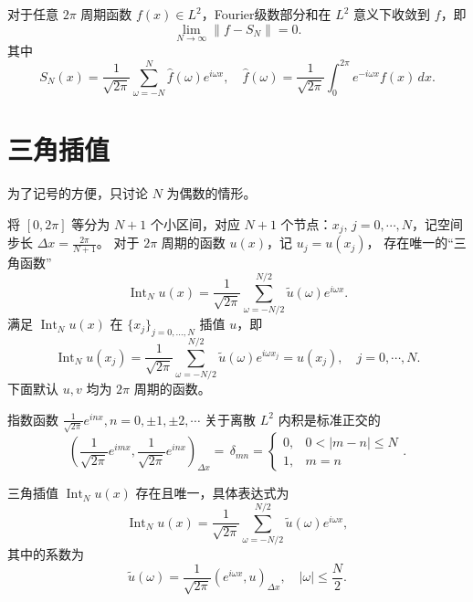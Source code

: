 \begin{theorem}
    对于任意 $2\pi$ 周期函数 $f(x) \in L^2$，Fourier级数部分和在 $L^2$ 意义下收敛到 $f$，即
    \[
        \lim_{N \to \infty} \|f - S_N\| = 0.
    \]
    其中
    \[
        S_N(x) = \frac{1}{\sqrt{2\pi}} \sum_{\omega = -N}^N \hat{f}(\omega) e^{i \omega x},\quad
        \hat{f}(\omega) = \frac{1}{\sqrt{2\pi}} \int_0^{2\pi} e^{-i \omega x}f(x)\,dx.
    \]
\end{theorem}


\section{三角插值}

为了记号的方便，只讨论 $N$ 为偶数的情形。

将 $[0,2\pi]$ 等分为 $N+1$ 个小区间，对应 $N+1$ 个节点：$x_j$, $j = 0,\cdots,N$，记空间步长 $\Delta x = \frac{2\pi}{N+1}$。
对于 $2\pi$ 周期的函数 $u(x)$，记 $u_j = u(x_j)$，
存在唯一的“三角函数”
\[
    \operatorname{Int}_N u(x) = \frac{1}{\sqrt{2\pi}} \sum_{\omega = -N/2}^{N/2} \widetilde{u}(\omega) e^{i \omega x}.
\]
满足 $\operatorname{Int}_N u(x)$ 在 $\{x_j\}_{j=0,\dots,N}$ 插值 $u$，即
\[
    \operatorname{Int}_N u(x_j) = \frac{1}{\sqrt{2\pi}} \sum_{\omega = -N/2}^{N/2} \widetilde{u}(\omega) e^{i \omega x_j} = u(x_j),\quad
    j=0,\cdots,N.
\]
下面默认 $u,v$ 均为 $2\pi$ 周期的函数。

\begin{lemma}
    指数函数 $\frac{1}{\sqrt{2\pi}} e^{i n x},n=0,\pm 1,\pm 2,\cdots$
    关于离散 $L^2$ 内积是标准正交的
    \[
        \left(\frac{1}{\sqrt{2\pi}} e^{i m x},\frac{1}{\sqrt{2\pi}} e^{i n x}\right)_{\Delta x}
        =\, \delta_{mn} =
        \begin{cases}
            0, & 0 < |m-n| \le N \\
            1, & m = n
        \end{cases}.
    \]
\end{lemma}


\begin{theorem}
    三角插值 $\operatorname{Int}_N u(x)$ 存在且唯一，具体表达式为
    \[
        \operatorname{Int}_N u(x) = \frac{1}{\sqrt{2\pi}} \sum_{\omega = -N/2}^{N/2} \widetilde{u}(\omega) e^{i \omega x},
    \]
    其中的系数为
    \[
        \widetilde{u}(\omega) = \frac{1}{\sqrt{2\pi}}(e^{i \omega x},u)_{\Delta x},\quad
        |\omega| \le \frac{N}{2}.
    \]
\end{theorem}


